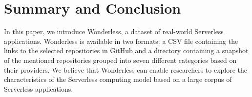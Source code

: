 \section{Summary and Conclusion}
\label{summary}

In this paper, we introduce Wonderless, a dataset of 
real-world Serverless applications. Wonderless is available in two 
formats: a CSV file containing the links to the selected repositories 
in GitHub and a directory containing a snapshot of the mentioned 
repositories grouped into seven different categories based on their providers. 
We believe that Wonderless can enable researchers to explore 
the characteristics of the Serverless computing model based on a large corpus
of Serverless applications. 





